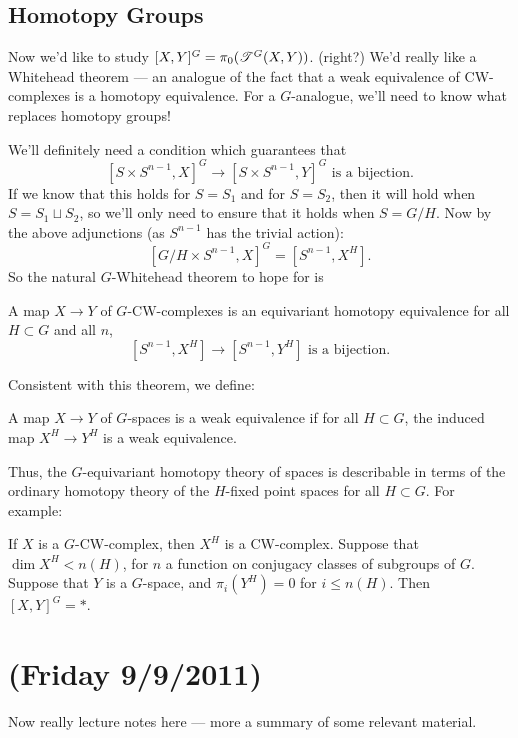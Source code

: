 \documentclass[11pt]{article}
\newcommand{\rednote}[1]{{\color{red}#1}\scalebox{.1}{rednote}}
\newcommand{\NewLecture}[3]{\section{#1 {\small(#2/#3/2011)}}}
\begin{document}
\subsection*{Homotopy Groups}
Now we'd like to study $[X,Y]^G=\pi_0(\mathscr{T}^G(X,Y))$. \rednote{(right?)} We'd really like a Whitehead theorem --- an analogue of the fact that a weak equivalence of CW-complexes is a homotopy equivalence. For a $G$-analogue, we'll need to know what replaces homotopy groups!

We'll definitely need a condition which guarantees that
\[[S\times S^{n-1},X]^G\to[S\times S^{n-1},Y]^G\text{\ \ is a bijection.}\]
If we know that this holds for $S=S_1$ and for $S=S_2$, then it will hold when $S=S_1\sqcup S_2$, so we'll only need to ensure that it holds when $S=G/H$. Now by the above adjunctions (as $S^{n-1}$ has the trivial action):
\[[G/H\times S^{n-1},X]^G=[S^{n-1},X^H].\]
So the natural $G$-Whitehead theorem to hope for is
\begin{thm*}
A map $X\to Y$ of $G$-CW-complexes is an equivariant homotopy equivalence \Iff for all $H\subset G$ and all $n$,
\[[S^{n-1},X^H]\to[S^{n-1},Y^H]\text{\ \ is a bijection}.\]
\end{thm*}
\noindent Consistent with this theorem, we define:
\begin{defn*}
A map $X\to Y$ of $G$-spaces is a weak equivalence if for all $H\subset G$, the induced map $X^H\to Y^H$ is a weak equivalence.
\end{defn*}
\noindent
Thus, the $G$-equivariant homotopy theory of spaces is describable in terms of the ordinary homotopy theory of the $H$-fixed point spaces for all $H\subset G$.  For example:
\begin{thm*}
If $X$ is a $G$-CW-complex, then $X^H$ is a CW-complex. Suppose that $\dim X^H<n(H)$, for $n$ a function on conjugacy classes of subgroups of $G$. Suppose that $Y$ is a $G$-space, and $\pi_i(Y^H)=0$ for $i\leq n(H)$. Then $[X,Y]^G=*$.
\end{thm*}
\NewLecture{}{Friday 9}{9}
Now really lecture notes here --- more a summary of some relevant material.
\end{document}
